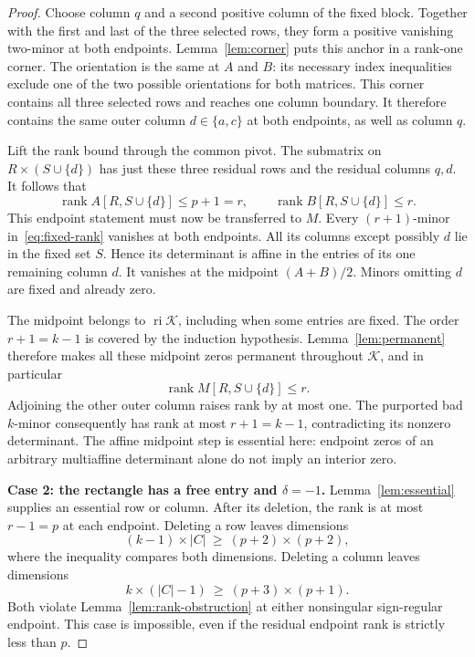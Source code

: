 \documentclass[10pt,a4paper]{article}
\theoremstyle{definition}
\theoremstyle{remark}
\numberwithin{equation}{section}
\newcommand{\K}{\mathcal K}
\DeclareMathOperator{\rank}{rank}
\DeclareMathOperator{\ri}{ri}
\begin{document}
\begin{proof}
Choose column $q$ and a second positive column of the fixed
block. Together with the first and last of the three selected
rows, they form a positive vanishing two-minor at both endpoints.
Lemma~\ref{lem:corner} puts this anchor in a rank-one corner.
The orientation is the same at $A$ and $B$: its necessary index
inequalities exclude one of the two possible orientations for
both matrices. This corner contains all three selected rows
and reaches one column boundary. It therefore contains the
same outer column $d\in\{a,c\}$ at both endpoints, as well
as column $q$.

Lift the rank bound through the common pivot. The submatrix
on $R\times(S\cup\{d\})$ has just these three residual rows
and the residual columns $q,d$. It follows that
\begin{equation}\label{eq:fixed-rank}
 \rank A[R,S\cup\{d\}]\leq p+1=r,
 \qquad
 \rank B[R,S\cup\{d\}]\leq r.
\end{equation}
This endpoint statement must now be transferred to $M$.
Every $(r+1)$-minor in~\eqref{eq:fixed-rank} vanishes at both
endpoints. All its columns except possibly $d$ lie in the fixed
set $S$. Hence its determinant is affine in the entries of its
one remaining column $d$. It vanishes at the midpoint
$(A+B)/2$. Minors omitting $d$ are fixed and already zero.

The midpoint belongs to $\ri\K$, including when some entries
are fixed. The order $r+1=k-1$ is covered by the induction
hypothesis. Lemma~\ref{lem:permanent} therefore makes all these
midpoint zeros permanent throughout $\K$, and in particular
\[
 \rank M[R,S\cup\{d\}]\leq r.
\]
Adjoining the other outer column raises rank by at most one.
The purported bad $k$-minor consequently has rank at most
$r+1=k-1$, contradicting its nonzero determinant.
The affine midpoint step is essential here: endpoint zeros of
an arbitrary multiaffine determinant alone do not imply an
interior zero.

\medskip\noindent
\textbf{Case 2: the rectangle has a free entry and $\delta=-1$.}
Lemma~\ref{lem:essential} supplies an essential row or column.
After its deletion, the rank is at most $r-1=p$ at each
endpoint. Deleting a row leaves dimensions
\[
 (k-1)\times|C|\ \geq\ (p+2)\times(p+2),
\]
where the inequality compares both dimensions. Deleting a
column leaves dimensions
\[
 k\times(|C|-1)\ \geq\ (p+3)\times(p+1).
\]
Both violate Lemma~\ref{lem:rank-obstruction} at either
nonsingular sign-regular endpoint. This case is impossible,
even if the residual endpoint rank is strictly less than $p$.


\end{proof}
\end{document}
